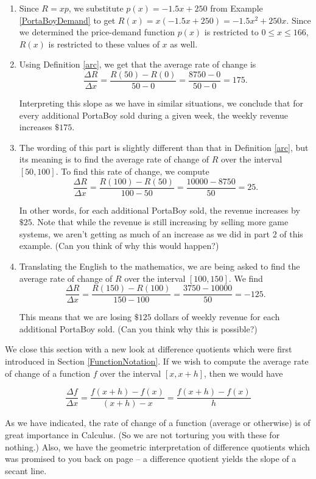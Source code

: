 {
\begin{enumerate}

\item  Since $R = xp$, we substitute $p(x) = -1.5x + 250$ from Example \ref{PortaBoyDemand} to get $R(x) = x (-1.5x + 250) = -1.5x^2+250x$. Since we determined the price-demand function $p(x)$ is restricted to $0 \leq x \leq 166$, $R(x)$ is restricted to these values of $x$ as well.

\item  Using Definition \ref{arc}, we get that the average rate of change is \[ \dfrac{\Delta R}{\Delta x} = \dfrac{R(50) - R(0)}{50 - 0} = \dfrac{8750 - 0}{50 - 0} = 175.\]

Interpreting this slope as we have in similar situations, we conclude that for every additional PortaBoy sold during a given week, the weekly revenue increases $\$ 175$.

\item  The wording of this part is slightly different than that in Definition 
\ref{arc}, but its meaning is to find the average rate of change of $R$ over the interval $[50,100]$.  To find this rate of change, we compute \[ \dfrac{\Delta R}{\Delta x} = \dfrac{R(100) - R(50)}{100-50} = \dfrac{10000 - 8750}{50} = 25.\]

In other words, for each additional PortaBoy sold, the revenue increases by $\$25$.  Note that while the revenue is still increasing by selling more game systems, we aren't getting as much of an increase as we did in part 2 of this example. (Can you think of why this would happen?)

\item  Translating the English to the mathematics, we are being asked to find the average rate of change of $R$ over the interval $[100,150]$.  We find \[ \dfrac{\Delta R}{\Delta x} = \dfrac{R(150) - R(100)}{150-100} = \dfrac{3750 - 10000}{50} = -125.\]

This means that we are losing $\$125$ dollars of weekly revenue for each additional PortaBoy sold.  (Can you think why this is possible?)

\end{enumerate}
}

\medskip

We close this section with a new look at difference quotients which were first introduced in Section \ref{FunctionNotation}.  If we wish to compute the average rate of change of a function $f$ over the interval $[x, x+h]$, then we would have

\[ \dfrac{\Delta f}{\Delta x} = \dfrac{f(x+h) - f(x)}{(x+h) - x} = \dfrac{f(x+h) - f(x)}{h}\]

As we have indicated, the rate of change of a function (average or otherwise) is of great importance in Calculus. (So we are not torturing you with these for nothing.) Also, we have the geometric interpretation of difference quotients which was promised to you back on page \pageref{diffquotgeompromise} -- a difference quotient yields the slope of a secant line.

